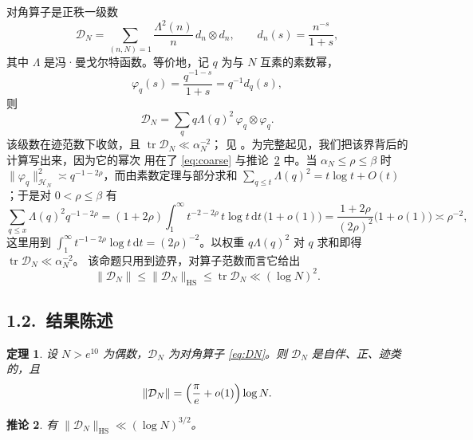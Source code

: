 \documentclass[12pt,a4paper]{amsart}
\numberwithin{equation}{section}
\theoremstyle{plain}
\newtheorem{theorem}{定理}[section]
\newtheorem{corollary}[theorem]{推论}
\theoremstyle{definition}
\newcommand{\HS}{\mathrm{HS}}
\newcommand{\dd}{\,\mathrm{d}}
\begin{document}
对角算子是正秩一级数
\begin{equation}\label{eq:DN}
 \mathcal D_N=\sum_{(n,N)=1}\frac{\Lambda^2(n)}{n}\,d_n\otimes d_n,
 \qquad d_n(s)=\frac{n^{-s}}{1+s},
\end{equation}
其中 $\Lambda$ 是冯·曼戈尔特函数。等价地，记 $q$ 为与 $N$ 互素的素数幂，
\begin{equation}\label{eq:phiq}
 \varphi_q(s)=\frac{q^{-1-s}}{1+s}=q^{-1}d_q(s),
\end{equation}
则
\begin{equation}\label{eq:DN2}
 \mathcal D_N=\sum_{q}q\Lambda(q)^2\,\varphi_q\otimes\varphi_q .
\end{equation}
该级数在迹范数下收敛，且 $\operatorname{tr}\mathcal D_N\ll\alpha_N^{-2}$；
见 \cite[命题 6.5]{LL}。为完整起见，我们把该界背后的计算写出来，因为它的幂次
用在了 \eqref{eq:coarse} 与推论~\ref{cor:HS} 中。当 $\alpha_N\le\rho\le\beta$ 时
$\|\varphi_q\|^2_{\mathcal H_N}\asymp q^{-1-2\rho}$，而由素数定理与部分求和
$\sum_{q\le t}\Lambda(q)^2=t\log t+O(t)$；于是对 $0<\rho\le\beta$ 有
\begin{equation}\label{eq:tracesum}
 \sum_{q\le x}\Lambda(q)^2q^{-1-2\rho}
 =(1+2\rho)\int_1^\infty t^{-2-2\rho}\,t\log t\dd t\,\bigl(1+o(1)\bigr)
 =\frac{1+2\rho}{(2\rho)^2}\bigl(1+o(1)\bigr)\asymp\rho^{-2},
\end{equation}
这里用到 $\int_1^\infty t^{-1-2\rho}\log t\dd t=(2\rho)^{-2}$。以权重
$q\Lambda(q)^2$ 对 $q$ 求和即得 $\operatorname{tr}\mathcal D_N\ll\alpha_N^{-2}$。
该命题只用到迹界，对算子范数而言它给出
\begin{equation}\label{eq:coarse}
 \|\mathcal D_N\|\le\|\mathcal D_N\|_{\HS}\le\operatorname{tr}\mathcal D_N
 \ll(\log N)^2 .
\end{equation}

\subsection*{1.2.\ 结果陈述}

\begin{theorem}\label{thm:main}
设 $N>e^{10}$ 为偶数，$\mathcal D_N$ 为对角算子 \eqref{eq:DN}。则
$\mathcal D_N$ 是自伴、正、迹类的，且
\begin{equation}\label{eq:main}
 \|\mathcal D_N\|=\Bigl(\frac{\pi}{e}+o(1)\Bigr)\log N .
\end{equation}
\end{theorem}

\begin{corollary}\label{cor:HS}
有 $\|\mathcal D_N\|_{\HS}\ll(\log N)^{3/2}$。
\end{corollary}
\end{document}
